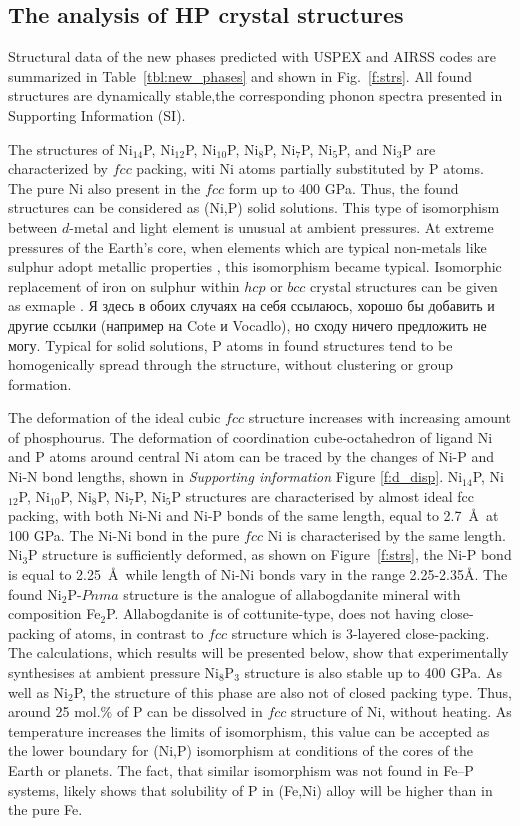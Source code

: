 \documentclass[twoside,twocolumn,9pt]{article}
\begin{document}
\subsection{The analysis of HP crystal structures}
Structural data of the new phases predicted with USPEX and AIRSS codes are summarized in Table~\ref{tbl:new_phases} and shown in Fig.~\ref{f:strs}. All found structures are dynamically stable,the corresponding phonon spectra presented in Supporting Information (SI).  

The structures of Ni$_{14}$P, Ni$_{12}$P, Ni$_{10}$P, Ni$_8$P, Ni$_7$P, Ni$_5$P, and Ni$_3$P are characterized by $fcc$ packing, witi Ni atoms partially substituted by P atoms. 
The pure Ni also present in the $fcc$ form up to 400 GPa.
Thus, the found structures can be considered as (Ni,P) solid solutions.
This type of isomorphism between $d$-metal and light element is unusual at ambient pressures.
At extreme pressures of the Earth's core, when elements which are typical non-metals like sulphur adopt metallic properties \cite{gavr2017_s}, this isomorphism became typical.
Isomorphic replacement of iron on sulphur within $hcp$ or $bcc$ crystal structures can be given as exmaple \cite{gavr2016_fes}.
{\color{red} Я здесь в обоих случаях на себя ссылаюсь, хорошо бы добавить и другие ссылки (например на Cote и Vocadlo), но сходу ничего предложить не могу.}
Typical for solid solutions, P atoms in found structures tend to be homogenically spread through the structure, without clustering or group formation.

The deformation of the ideal cubic $fcc$ structure increases with increasing amount of phosphourus.
The deformation of coordination cube-octahedron of ligand Ni and P atoms around central Ni atom can be traced by the changes of Ni-P and Ni-N bond lengths, shown in {\it Supporting information} Figure \ref{f:d_disp}.
Ni$_{14}$P, Ni$_{12}$P, Ni$_{10}$P, Ni$_8$P, Ni$_7$P, Ni$_5$P structures are characterised by almost ideal fcc packing, with both Ni-Ni and Ni-P bonds of the same length, equal to 2.7~\AA\ at 100 GPa.
The Ni-Ni bond in the pure $fcc$ Ni is characterised by the same length.
Ni$_3$P structure is sufficiently deformed, as shown on Figure~\ref{f:strs}, the Ni-P bond is equal to 2.25~\AA\, while length of Ni-Ni bonds vary in the range 2.25-2.35\AA.
The found Ni$_2$P-$Pnma$ structure is the analogue of allabogdanite mineral with composition Fe$_2$P.
Allabogdanite is of cottunite-type, does not having close-packing of atoms, in contrast to $fcc$ structure which is 3-layered close-packing.
The calculations, which results will be presented below, show that experimentally synthesises at ambient pressure Ni$_8$P$_3$ structure is also stable up to 400 GPa.
As well as Ni$_2$P, the structure of this phase are also not of closed packing type.
Thus, around 25 mol.\% of P can be dissolved in $fcc$ structure of Ni, without heating.
As temperature increases the limits of isomorphism, this value can be accepted as the lower boundary for (Ni,P) isomorphism at conditions of the cores of the Earth or planets.
The fact, that similar isomorphism was not found in Fe--P systems, likely shows that solubility of P in (Fe,Ni) alloy will be higher than in the pure Fe.
\end{document}
